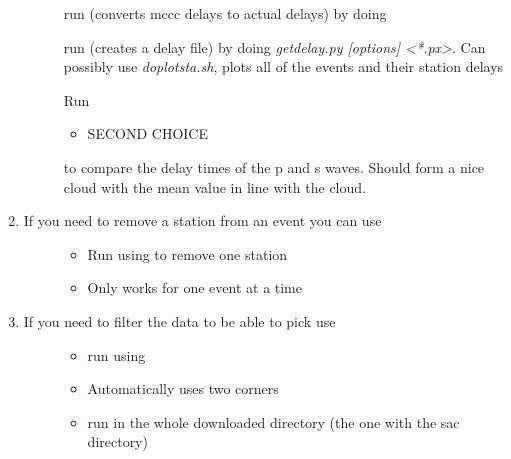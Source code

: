 \documentclass[letterpaper,10pt,english]{sphinxmanual}
\begin{document}
\begin{enumerate}
\begin{description}
\begin{itemize}
\end{itemize}

run  (converts mccc delays to actual delays) by doing 

run  (creates a delay file) by doing \emph{getdelay.py {[}options{]} \textless{}*.px\textgreater{}}. Can possibly use \emph{doplotsta.sh}, plots all of the events and their station delays

Run 
\begin{itemize}
\item {} 
SECOND CHOICE

\end{itemize}

 to compare the delay times of the p and s waves. Should form a nice cloud with the mean value in line with the cloud.

\end{description}

\item {} \begin{description}
\item[{If you need to remove a station from an event you can use }] \leavevmode\begin{itemize}
\item {} 
Run using  to remove one station

\item {} 
Only works for one event at a time

\end{itemize}

\end{description}

\item {} \begin{description}
\item[{If you need to filter the data to be able to pick use }] \leavevmode\begin{itemize}
\item {} 
run using 

\item {} 
Automatically uses two corners

\item {} 
run in the whole downloaded directory (the one with the sac directory)

\end{itemize}

\end{description}

\end{enumerate}
\end{document}
